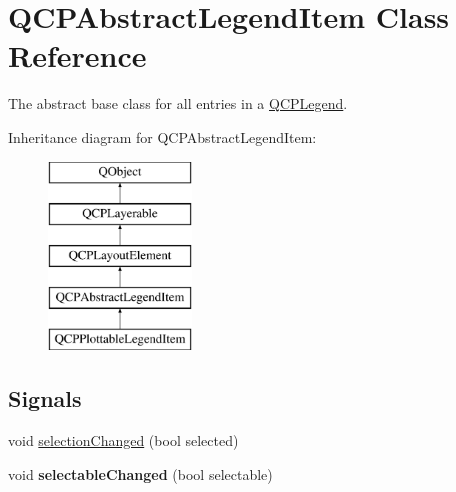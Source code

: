 \hypertarget{class_q_c_p_abstract_legend_item}{}\section{Q\+C\+P\+Abstract\+Legend\+Item Class Reference}
\label{class_q_c_p_abstract_legend_item}


The abstract base class for all entries in a \mbox{\hyperlink{class_q_c_p_legend}{Q\+C\+P\+Legend}}.  


Inheritance diagram for Q\+C\+P\+Abstract\+Legend\+Item\+:\begin{figure}[H]
\begin{center}
\leavevmode
\includegraphics[height=5.000000cm]{class_q_c_p_abstract_legend_item}
\end{center}
\end{figure}
\subsection*{Signals}
\begin{DoxyCompactItemize}
\item 
void \mbox{\hyperlink{class_q_c_p_abstract_legend_item_a7cb61fdfbaf69c590bacb8f9e7099d9e}{selection\+Changed}} (bool selected)
\item 
\mbox{\label{class_q_c_p_abstract_legend_item_abc4d779b938cc9235f9196737dbaa6bd}} 
void {\bfseries selectable\+Changed} (bool selectable)
\end{DoxyCompactItemize}
